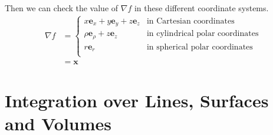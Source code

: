 \documentclass{article}
\begin{document}
Then we can check the value of $\nabla f$ in these different coordinate systems.
\begin{align*}
    \nabla f & = \begin{cases}
        x \bm e_x + y \bm e_y + z \bm e_z & \text{in Cartesian coordinates}         \\
        \rho \bm e_\rho + z \bm e_z       & \text{in cylindrical polar coordinates} \\
        r \bm e_r                         & \text{in spherical polar coordinates}   \\
    \end{cases} \\
             & = \bm x
\end{align*}

\section{Integration over Lines, Surfaces and Volumes}
\end{document}
